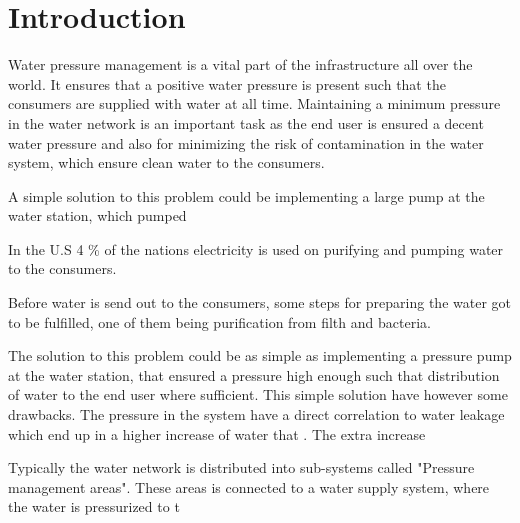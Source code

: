 \chapter{Introduction}

Water pressure management is a vital part of the infrastructure all over the world. It ensures that a positive water pressure is present such that the consumers are supplied with water at all time. Maintaining a minimum pressure in the water network is an important task as the end user is ensured a decent water pressure and also for minimizing the risk of contamination in the water system\cite{national2005public}, which ensure clean water to the consumers. %

A simple solution to this problem could be implementing a large pump at the water station, which pumped

In the U.S 4 \% of the nations electricity is used on purifying and pumping water to the consumers. 

Before water is send out to the consumers, some steps for preparing the water got to be fulfilled, one of them being purification from filth and bacteria.  




The solution to this problem could be as simple as implementing a pressure pump at the water station, that ensured a pressure high enough such that distribution of water to the end user where sufficient. This simple solution have however some drawbacks. The pressure in the system have a direct correlation to water leakage which end up in a higher increase of water that . The extra increase 


Typically the water network is distributed into sub-systems called "Pressure management areas". These areas is connected to a water supply system, where the water is pressurized to t  



